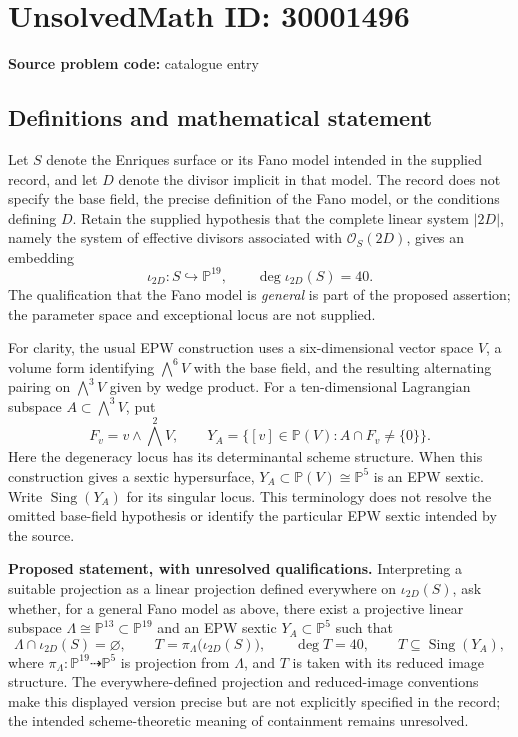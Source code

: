 \documentclass[11pt]{article}
\begin{document}
\section*{UnsolvedMath ID: 30001496}
\textbf{Source problem code:} catalogue entry
\subsection{Definitions and mathematical statement}
Let \(S\) denote the Enriques surface or its Fano model intended in the supplied record, and let \(D\) denote the divisor implicit in that model. The record does not specify the base field, the precise definition of the Fano model, or the conditions defining \(D\). Retain the supplied hypothesis that the complete linear system \(|2D|\), namely the system of effective divisors associated with \(\mathcal O_S(2D)\), gives an embedding
\[
\iota_{2D}\colon S\hookrightarrow\mathbb P^{19},
\qquad \deg\iota_{2D}(S)=40.
\]
The qualification that the Fano model is \emph{general} is part of the proposed assertion; the parameter space and exceptional locus are not supplied.

For clarity, the usual EPW construction uses a six-dimensional vector space \(V\), a volume form identifying \(\bigwedge^6V\) with the base field, and the resulting alternating pairing on \(\bigwedge^3V\) given by wedge product. For a ten-dimensional Lagrangian subspace \(A\subset\bigwedge^3V\), put
\[
F_v=v\wedge\bigwedge^2V,
\qquad
Y_A=\bigl\{[v]\in\mathbb P(V):A\cap F_v\ne\{0\}\bigr\}.
\]
Here the degeneracy locus has its determinantal scheme structure. When this construction gives a sextic hypersurface, \(Y_A\subset\mathbb P(V)\cong\mathbb P^5\) is an EPW sextic. Write \(\operatorname{Sing}(Y_A)\) for its singular locus. This terminology does not resolve the omitted base-field hypothesis or identify the particular EPW sextic intended by the source.

\textbf{Proposed statement, with unresolved qualifications.} Interpreting a suitable projection as a linear projection defined everywhere on \(\iota_{2D}(S)\), ask whether, for a general Fano model as above, there exist a projective linear subspace \(\Lambda\cong\mathbb P^{13}\subset\mathbb P^{19}\) and an EPW sextic \(Y_A\subset\mathbb P^5\) such that
\[
\Lambda\cap\iota_{2D}(S)=\varnothing,
\qquad
T=\pi_\Lambda\bigl(\iota_{2D}(S)\bigr),
\qquad
\deg T=40,
\qquad
T\subseteq\operatorname{Sing}(Y_A),
\]
where \(\pi_\Lambda\colon\mathbb P^{19}\dashrightarrow\mathbb P^5\) is projection from \(\Lambda\), and \(T\) is taken with its reduced image structure. The everywhere-defined projection and reduced-image conventions make this displayed version precise but are not explicitly specified in the record; the intended scheme-theoretic meaning of containment remains unresolved.
\end{document}
